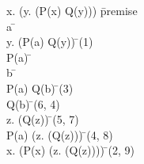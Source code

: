 \documentclass{article}
\begin{document}
\begin{proofbox}
\: \forall x. (\forall y. (P(x) \rightarrow Q(y))) \= \hbox{premise} \\
\open
\: a \= \forallintroconst \\
\: \forall y. (P(a) \rightarrow Q(y)) \= \forallelim(1) \\
\open
\: P(a) \= \asm \\
\open
\: b \= \forallintroconst \\
\: P(a) \rightarrow Q(b) \= \forallelim(3) \\
\: Q(b) \= \implieselim(6, 4) \\
\close
\: \forall z. (Q(z)) \= \forallintro(5, 7) \\
\close
\: P(a) \rightarrow (\forall z. (Q(z))) \= \impliesintro(4, 8) \\
\close
\: \forall x. (P(x) \rightarrow (\forall z. (Q(z)))) \= \forallintro(2, 9) \\
\end{proofbox}
\end{document}
